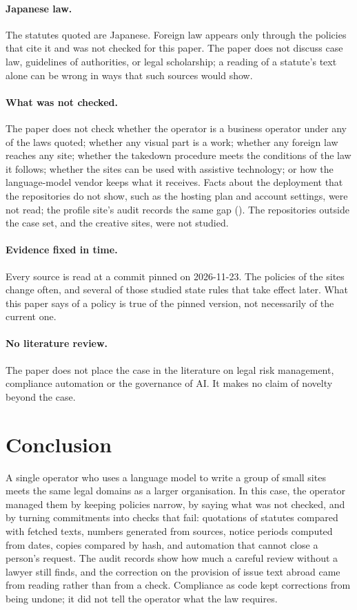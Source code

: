 \documentclass[11pt]{article}
\newcommand{\ev}[1]{\directlua{ev("\luaescapestring{#1}")}}
\newcommand{\citeev}[1]{(\ev{#1})}
\begin{document}
\paragraph{Japanese law.} The statutes quoted are Japanese. Foreign law appears only through the policies that cite it and was not checked for this paper. The paper does not discuss case law, guidelines of authorities, or legal scholarship; a reading of a statute's text alone can be wrong in ways that such sources would show.

\paragraph{What was not checked.} The paper does not check whether the operator is a business operator under any of the laws quoted; whether any visual part is a work; whether any foreign law reaches any site; whether the takedown procedure meets the conditions of the law it follows; whether the sites can be used with assistive technology; or how the language-model vendor keeps what it receives. Facts about the deployment that the repositories do not show, such as the hosting plan and account settings, were not read; the profile site's audit records the same gap \citeev{audit-tos-plan}. The repositories outside the case set, and the creative sites, were not studied.

\paragraph{Evidence fixed in time.} Every source is read at a commit pinned on 2026-11-23. The policies of the sites change often, and several of those studied state rules that take effect later. What this paper says of a policy is true of the pinned version, not necessarily of the current one.

\paragraph{No literature review.} The paper does not place the case in the literature on legal risk management, compliance automation or the governance of AI. It makes no claim of novelty beyond the case.

\section{Conclusion}

A single operator who uses a language model to write a group of small sites meets the same legal domains as a larger organisation. In this case, the operator managed them by keeping policies narrow, by saying what was not checked, and by turning commitments into checks that fail: quotations of statutes compared with fetched texts, numbers generated from sources, notice periods computed from dates, copies compared by hash, and automation that cannot close a person's request. The audit records show how much a careful review without a lawyer still finds, and the correction on the provision of issue text abroad came from reading rather than from a check. Compliance as code kept corrections from being undone; it did not tell the operator what the law requires.
\end{document}
